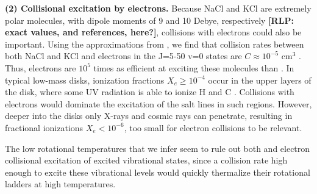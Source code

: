 \documentclass[twocolumn]{aastex62}
\newcommand{\rlp}[1]{\textcolor{blue!65!black}{\textbf{[RLP: #1]}}}
\begin{document}
\par{\textbf{(2) Collisional excitation by electrons.}} 
Because NaCl and KCl are extremely polar molecules, with dipole moments of
9 and 10 Debye, respectively \rlp{exact values, and references, here?}, 
collisions with electrons could also be important.
Using the approximations from \citet{Dickinson1975a}, we find that collision
rates between both NaCl and KCl and electrons in the J=5-50 v=0 states are
$C\approx10^{-5}$ cm$^{3}$ \pers.  Thus, electrons are $10^5$ times as
efficient at exciting these molecules than \hh. In typical
low-mass disks, ionization fractions $X_e \geq 10^{-4}$ occur in the upper layers
of the disk, where some UV radiation is able to ionize H and C %
\citep{Bergin2007a}.  Collisions with electrons would dominate the excitation of
the salt lines in such regions.  However, deeper into the disks only X-rays and cosmic
rays can penetrate, resulting in fractional ionizations $X_e < 10^{-6}$,
too small for electron collisions to be relevant. 

The low rotational temperatures that we infer seem to rule out both \hh and electron
collisional excitation of excited vibrational states, since a collision rate high enough
to excite these vibrational levels would quickly thermalize their rotational ladders 
at high temperatures.



\end{document}
